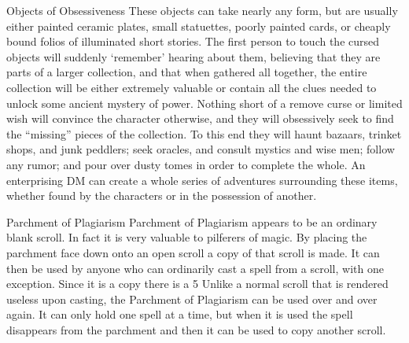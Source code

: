 Objects of Obsessiveness
These objects can take nearly any form, but are usually either painted ceramic plates, small statuettes, poorly painted cards, or cheaply bound folios of illuminated short stories. The first person to touch the cursed objects will suddenly ‘remember’ hearing about them, believing that they are parts of a larger collection, and that when gathered all together, the entire collection will be either extremely valuable or contain all the clues needed to unlock some ancient mystery of power. Nothing short of a remove curse or limited wish will convince the character otherwise, and they will obsessively seek to find the “missing” pieces of the collection. To this end they will haunt bazaars, trinket shops, and junk peddlers; seek oracles, and consult mystics and wise men; follow any rumor; and pour over dusty tomes in order to complete the whole. An enterprising DM can create a whole series of adventures surrounding these items, whether found by the characters or in the possession of another.


Parchment of Plagiarism
Parchment of Plagiarism appears to be an ordinary blank scroll. In fact it is very valuable to pilferers of magic.
By placing the parchment face down onto an open scroll a copy of that scroll is made. It can then be used by anyone who can ordinarily cast a spell from a scroll, with one exception. Since it is a copy there is a 5%
Unlike a normal scroll that is rendered useless upon casting, the Parchment of Plagiarism can be used over and over again. It can only hold one spell at a time, but when it is used the spell disappears from the parchment and then it can be used to copy another scroll.






